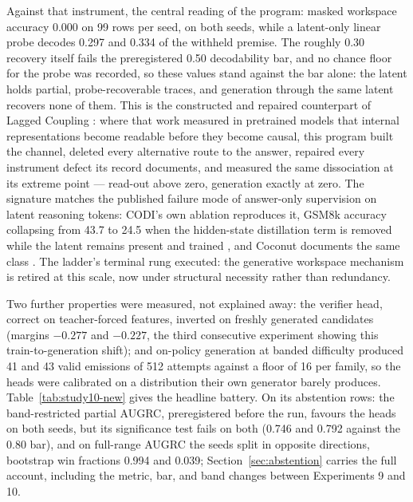 \documentclass[10pt,a4paper]{article}
\begin{document}
Against that instrument, the central reading of the program: masked workspace accuracy 0.000 on 99 rows per seed, on both seeds, while a latent-only linear probe decodes 0.297 and 0.334 of the withheld premise. The roughly 0.30 recovery itself fails the preregistered 0.50 decodability bar, and no chance floor for the probe was recorded, so these values stand against the bar alone: the latent holds partial, probe-recoverable traces, and generation through the same latent recovers none of them. This is the constructed and repaired counterpart of Lagged Coupling \cite{xun2026lagged}: where that work measured in pretrained models that internal representations become readable before they become causal, this program built the channel, deleted every alternative route to the answer, repaired every instrument defect its record documents, and measured the same dissociation at its extreme point --- read-out above zero, generation exactly at zero. The signature matches the published failure mode of answer-only supervision on latent reasoning tokens: CODI's own ablation reproduces it, GSM8k accuracy collapsing from 43.7 to 24.5 when the hidden-state distillation term is removed while the latent remains present and trained \cite{codi2025}, and Coconut documents the same class \cite{coconut2024}. The ladder's terminal rung executed: the generative workspace mechanism is retired at this scale, now under structural necessity rather than redundancy.

Two further properties were measured, not explained away: the verifier head, correct on teacher-forced features, inverted on freshly generated candidates (margins $-0.277$ and $-0.227$, the third consecutive experiment showing this train-to-generation shift); and on-policy generation at banded difficulty produced 41 and 43 valid emissions of 512 attempts against a floor of 16 per family, so the heads were calibrated on a distribution their own generator barely produces. Table~\ref{tab:study10-new} gives the headline battery. On its abstention rows: the band-restricted partial AUGRC, preregistered before the run, favours the heads on both seeds, but its significance test fails on both (0.746 and 0.792 against the 0.80 bar), and on full-range AUGRC the seeds split in opposite directions, bootstrap win fractions 0.994 and 0.039; Section~\ref{sec:abstention} carries the full account, including the metric, bar, and band changes between Experiments 9 and 10.
\end{document}
